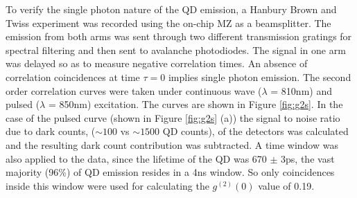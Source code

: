 To verify the single photon nature of the QD emission, a Hanbury Brown and Twiss
experiment was recorded using the on-chip MZ as a beamsplitter. The emission
from both arms was sent through two different transmission gratings for spectral
filtering and then sent to avalanche photodiodes. The signal in one arm was
delayed so as to measure negative correlation times. An absence of correlation
coincidences at time $\tau = 0$ implies single photon emission. The second order
correlation curves were taken under continuous wave ($\lambda$ = 810nm) and
pulsed ($\lambda$ = 850nm) excitation. The curves are shown in Figure
\ref{fig:g2s}. In the case of the pulsed curve (shown in Figure \ref{fig:g2s}
(a)) the signal to noise ratio due to dark counts, ($\sim \mathrm{100}$ vs $\sim
\mathrm{1500}$ QD counts), of the detectors was calculated and the resulting
dark count contribution was subtracted. A time window was also applied to the
data, since the lifetime of the QD was 670 $\pm$ 3ps, the vast majority (96\%)
of QD emission resides in a 4ns window. So only coincidences inside this window
were used for calculating the $g^{(2)}(0)$ value of 0.19.


